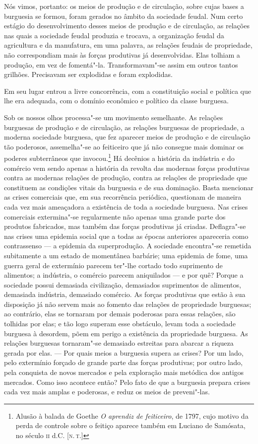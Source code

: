 Nós vimos, portanto: os meios de produção e de circulação, sobre cujas
bases a burguesia se formou, foram gerados no âmbito da sociedade
feudal. Num certo estágio do desenvolvimento desses meios de produção e
de circulação, as relações nas quais a sociedade feudal produzia e
trocava, a organização feudal da agricultura e da manufatura, em uma
palavra, as relações feudais de propriedade, não correspondiam mais às
forças produtivas já desenvolvidas. Elas tolhiam a produção, em vez de
fomentá"-la. Transformavam"-se assim em outros tantos grilhões.
Precisavam ser explodidas e foram explodidas.

Em seu lugar entrou a livre concorrência, com a constituição social e
política que lhe era adequada, com o domínio econômico e político da
classe burguesa.

Sob os nossos olhos processa"-se um movimento semelhante. As relações
burguesas de produção e de circulação, as relações burguesas de
propriedade, a moderna sociedade burguesa, que fez aparecer meios de
produção e de circulação tão poderosos, assemelha"-se ao feiticeiro
que já não consegue mais dominar os poderes subterrâneos que invocou.\footnote{Alusão à balada de Goethe \textit{O aprendiz de feiticeiro}, de 1797, cujo motivo da perda de controle sobre o feitiço aparece também em Luciano de Samósata, no século \textsc{ii} d.C. [\textsc{n.\,t.}]}
Há decênios a história da indústria e do comércio vem sendo apenas a
história da revolta das modernas forças produtivas contra as modernas
relações de produção, contra as relações de propriedade que constituem
as condições vitais da burguesia e de sua dominação. Basta mencionar as
crises comerciais que, em sua recorrência periódica, questionam de
maneira cada vez mais ameaçadora a existência de toda a sociedade
burguesa. Nas crises comerciais extermina"-se regularmente não apenas
uma grande parte dos produtos fabricados, mas também das forças
produtivas já criadas. Deflagra"-se nas crises uma epidemia social que
a todas as épocas anteriores apareceria como contrassenso  ---  a
epidemia da superprodução. A sociedade encontra"-se remetida
subitamente a um estado de momentânea barbárie; uma epidemia de fome,
uma guerra geral de extermínio parecem ter"-lhe cortado todo
suprimento de alimentos; a indústria, o comércio parecem aniquilados  --- 
e por quê? Porque a sociedade possui demasiada civilização, demasiados
suprimentos de alimentos, demasiada indústria, demasiado comércio. As
forças produtivas que estão à sua disposição já não servem mais ao
fomento das relações de propriedade burguesas; ao contrário, elas se
tornaram por demais poderosas para essas relações, são tolhidas por
elas; e tão logo superam esse obstáculo, levam toda a sociedade
burguesa à desordem, põem em perigo a existência da propriedade
burguesa. As relações burguesas tornaram"-se demasiado estreitas para
abarcar a riqueza gerada por elas. --- Por quais meios a burguesia supera    \label{9}
as crises? Por um lado, pelo extermínio forçado de grande parte das
forças produtivas; por outro lado, pela conquista de novos mercados e
pela exploração mais metódica dos antigos mercados. Como isso acontece
então? Pelo fato de que a burguesia prepara crises cada vez mais amplas
e poderosas, e reduz os meios de preveni"-las.

